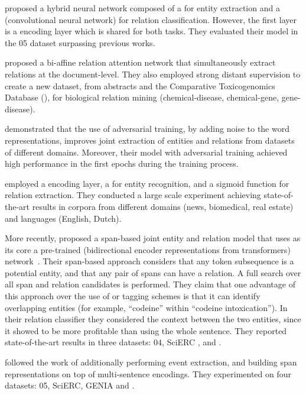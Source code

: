 \textcite{zheng2017c} proposed a hybrid neural network composed of a  for entity extraction and a  (convolutional neural network) for relation classification.
However, the first layer is a  encoding layer which is shared for both tasks.
They evaluated their model in the 05 dataset surpassing previous works.

\textcite{verga2018a} proposed a bi-affine relation attention network that simultaneously extract relations at the document-level.
They also employed strong distant supervision to create a new dataset, from  abstracts and the Comparative Toxicogenomics Database (), for biological relation mining (chemical-disease, chemical-gene, gene-disease).

\textcite{bekoulis2018c} demonstrated that the use of adversarial training, by adding noise to the word representations, improves joint extraction of entities and relations from datasets of different domains.
Moreover, their model with adversarial training achieved high performance in the first epochs during the training process.

\textcite{bekoulis2018a} employed a  encoding layer, a  for entity recognition, and a sigmoid function for relation extraction.
They conducted a large scale experiment achieving state-of-the-art results in corpora from different domains (news, biomedical, real estate) and languages (English, Dutch).

More recently, \textcite{eberts2019a} proposed a span-based joint entity and relation model that uses as its core a pre-trained  (bidirectional encoder representations from transformers) network~\parencite{devlin2019a}.
Their span-based approach considers that any token subsequence is a potential entity, and that any pair of spans can have a relation.
A full search over all span and relation candidates is performed.
They claim that one advantage of this approach over the use of  or  tagging schemes is that it can identify overlapping entities (for example, ``codeine'' within ``codeine intoxication'').
In their relation classifier they considered the context between the two entities, since it showed to be more profitable than using the whole sentence.
They reported state-of-the-art results in three datasets: 04, SciERC \parencite{luan2018a}, and  \parencite{gurulingappa2012a}.

\textcite{wadden2019a} followed the work of \textcite{luan2019a} additionally performing event extraction, and building span representations on top of multi-sentence  encodings.
They experimented on four datasets: 05, SciERC, GENIA \parencite{kim2003a} and  \parencite{kulkarni2018a}.

